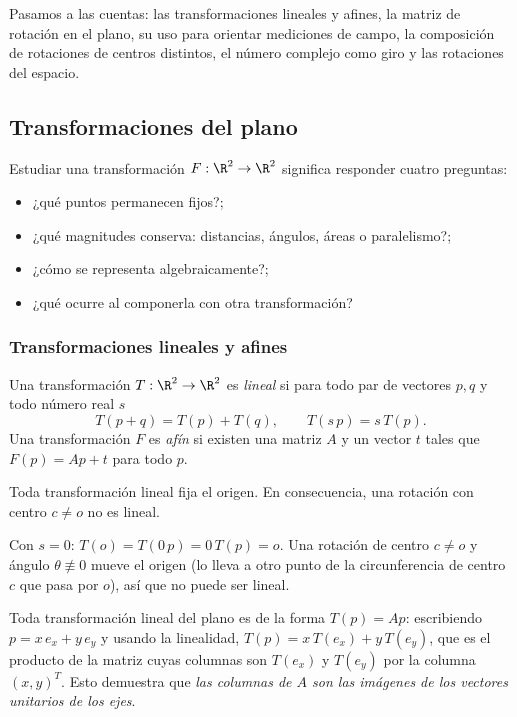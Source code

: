 Pasamos a las cuentas: las transformaciones lineales y afines, la matriz de rotación en el
plano, su uso para orientar mediciones de campo, la composición de rotaciones de centros
distintos, el número complejo como giro y las rotaciones del espacio.

\subsection{Transformaciones del plano}\label{sec:transf-plano}

Estudiar una transformación \(F:\R^2\to\R^2\) significa responder cuatro preguntas:
\begin{itemize}
  \item ¿qué puntos permanecen fijos?;
  \item ¿qué magnitudes conserva: distancias, ángulos, áreas o paralelismo?;
  \item ¿cómo se representa algebraicamente?;
  \item ¿qué ocurre al componerla con otra transformación?
\end{itemize}

\subsubsection{Transformaciones lineales y afines}

\begin{definicion}
Una transformación \(T:\R^2\to\R^2\) es \emph{lineal} si para todo par de vectores \(p,q\) y
todo número real \(s\)
\[
  T(p+q)=T(p)+T(q),\qquad T(s\,p)=s\,T(p).
\]
Una transformación \(F\) es \emph{afín} si existen una matriz \(A\) y un vector \(t\) tales
que \(F(p)=Ap+t\) para todo \(p\).
\end{definicion}

\begin{proposicion}\label{prop:lineal-origen}
Toda transformación lineal fija el origen. En consecuencia, una rotación con centro
\(c\neq o\) no es lineal.
\end{proposicion}

\begin{demostracion}
Con \(s=0\): \(T(o)=T(0\,p)=0\,T(p)=o\). Una rotación de centro \(c\neq o\) y ángulo
\(\theta\not\equiv0\) mueve el origen (lo lleva a otro punto de la circunferencia de centro
\(c\) que pasa por \(o\)), así que no puede ser lineal.
\end{demostracion}

Toda transformación lineal del plano es de la forma \(T(p)=Ap\): escribiendo
\(p=x\,e_x+y\,e_y\) y usando la linealidad, \(T(p)=x\,T(e_x)+y\,T(e_y)\), que es el producto
de la matriz cuyas columnas son \(T(e_x)\) y \(T(e_y)\) por la columna \((x,y)^T\). Esto
demuestra que \emph{las columnas de \(A\) son las imágenes de los vectores unitarios de los
ejes}.

